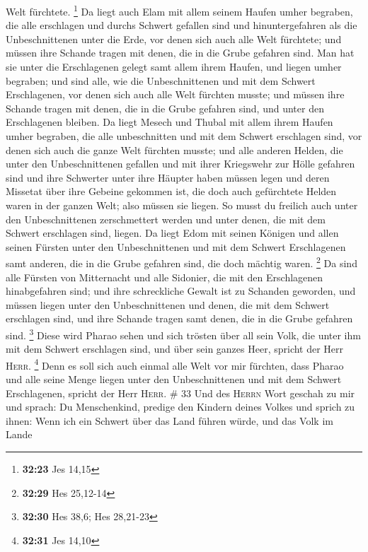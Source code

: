 Welt fürchtete. \footnote{\textbf{32:23} Jes 14,15}  Da
liegt auch Elam mit allem seinem Haufen umher begraben, die alle
erschlagen und durchs Schwert gefallen sind und hinuntergefahren als die
Unbeschnittenen unter die Erde, vor denen sich auch alle Welt fürchtete;
und müssen ihre Schande tragen mit denen, die in die Grube gefahren
sind.  Man hat sie unter die Erschlagenen gelegt samt
allem ihrem Haufen, und liegen umher begraben; und sind alle, wie die
Unbeschnittenen und mit dem Schwert Erschlagenen, vor denen sich auch
alle Welt fürchten musste; und müssen ihre Schande tragen mit denen, die
in die Grube gefahren sind, und unter den Erschlagenen bleiben.
 Da liegt Mesech und Thubal mit allem ihrem Haufen umher
begraben, die alle unbeschnitten und mit dem Schwert erschlagen sind,
vor denen sich auch die ganze Welt fürchten musste;  und
alle anderen Helden, die unter den Unbeschnittenen gefallen und mit
ihrer Kriegswehr zur Hölle gefahren sind und ihre Schwerter unter ihre
Häupter haben müssen legen und deren Missetat über ihre Gebeine gekommen
ist, die doch auch gefürchtete Helden waren in der ganzen Welt; also
müssen sie liegen.  So musst du freilich auch unter den
Unbeschnittenen zerschmettert werden und unter denen, die mit dem
Schwert erschlagen sind, liegen.  Da liegt Edom mit
seinen Königen und allen seinen Fürsten unter den Unbeschnittenen und
mit dem Schwert Erschlagenen samt anderen, die in die Grube gefahren
sind, die doch mächtig waren. \footnote{\textbf{32:29} Hes 25,12-14}
 Da sind alle Fürsten von Mitternacht und alle Sidonier,
die mit den Erschlagenen hinabgefahren sind; und ihre schreckliche
Gewalt ist zu Schanden geworden, und müssen liegen unter den
Unbeschnittenen und denen, die mit dem Schwert erschlagen sind, und ihre
Schande tragen samt denen, die in die Grube gefahren sind. \footnote{\textbf{32:30}
  Hes 38,6; Hes 28,21-23}  Diese wird Pharao sehen und
sich trösten über all sein Volk, die unter ihm mit dem Schwert
erschlagen sind, und über sein ganzes Heer, spricht der Herr
\textsc{Herr}. \footnote{\textbf{32:31} Jes 14,10}  Denn
es soll sich auch einmal alle Welt vor mir fürchten, dass Pharao und
alle seine Menge liegen unter den Unbeschnittenen und mit dem Schwert
Erschlagenen, spricht der Herr \textsc{Herr}. \# 33  Und
des \textsc{Herrn} Wort geschah zu mir und sprach:  Du
Menschenkind, predige den Kindern deines Volkes und sprich zu ihnen:
Wenn ich ein Schwert über das Land führen würde, und das Volk im Lande

